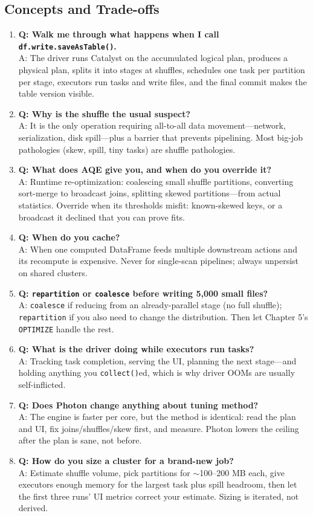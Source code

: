 \subsection{Concepts and Trade-offs}
\begin{enumerate}
    \item \textbf{Q: Walk me through what happens when I call \texttt{df.write.saveAsTable()}.}\\
    A: The driver runs Catalyst on the accumulated logical plan, produces a physical plan, splits it into stages at shuffles, schedules one task per partition per stage, executors run tasks and write files, and the final commit makes the table version visible.
    \item \textbf{Q: Why is the shuffle the usual suspect?}\\
    A: It is the only operation requiring all-to-all data movement---network, serialization, disk spill---plus a barrier that prevents pipelining. Most big-job pathologies (skew, spill, tiny tasks) are shuffle pathologies.
    \item \textbf{Q: What does AQE give you, and when do you override it?}\\
    A: Runtime re-optimization: coalescing small shuffle partitions, converting sort-merge to broadcast joins, splitting skewed partitions---from actual statistics. Override when its thresholds misfit: known-skewed keys, or a broadcast it declined that you can prove fits.
    \item \textbf{Q: When do you cache?}\\
    A: When one computed DataFrame feeds multiple downstream actions and its recompute is expensive. Never for single-scan pipelines; always unpersist on shared clusters.
    \item \textbf{Q: \texttt{repartition} or \texttt{coalesce} before writing 5,000 small files?}\\
    A: \texttt{coalesce} if reducing from an already-parallel stage (no full shuffle); \texttt{repartition} if you also need to change the distribution. Then let Chapter 5's \texttt{OPTIMIZE} handle the rest.
    \item \textbf{Q: What is the driver doing while executors run tasks?}\\
    A: Tracking task completion, serving the UI, planning the next stage---and holding anything you \texttt{collect()}ed, which is why driver OOMs are usually self-inflicted.
    \item \textbf{Q: Does Photon change anything about tuning method?}\\
    A: The engine is faster per core, but the method is identical: read the plan and UI, fix joins/shuffles/skew first, and measure. Photon lowers the ceiling after the plan is sane, not before.
    \item \textbf{Q: How do you size a cluster for a brand-new job?}\\
    A: Estimate shuffle volume, pick partitions for $\sim$100--200 MB each, give executors enough memory for the largest task plus spill headroom, then let the first three runs' UI metrics correct your estimate. Sizing is iterated, not derived.
\end{enumerate}

